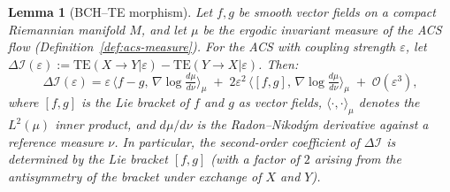 \documentclass[11pt,a4paper]{article}
\theoremstyle{plain}
\newtheorem{lemma}[theorem]{Lemma}
\theoremstyle{definition}
\theoremstyle{remark}
\newcommand{\DI}{\Delta\mathcal{I}}
\newcommand{\TE}{\mathrm{TE}}
\begin{document}
\begin{lemma}[BCH--TE morphism]\label{lem:bch-te}
Let $f, g$ be smooth vector fields on a compact Riemannian manifold $M$,
and let $\mu$ be the ergodic invariant measure of the ACS flow (Definition~\ref{def:acs-measure}).
For the ACS with coupling strength $\varepsilon$, let
$\DI(\varepsilon) := \TE(X{\to}Y|\varepsilon) - \TE(Y{\to}X|\varepsilon)$.
Then:
\[
  \DI(\varepsilon) = \varepsilon\,\langle f - g,\, \nabla\log\tfrac{d\mu}{d\nu}\rangle_\mu
  \;+\; 2\varepsilon^2\,\langle [f,g],\, \nabla\log\tfrac{d\mu}{d\nu}\rangle_\mu
  \;+\; \mathcal{O}(\varepsilon^3),
\]
where $[f,g]$ is the Lie bracket of $f$ and $g$ as vector fields,
$\langle\cdot,\cdot\rangle_\mu$ denotes the $L^2(\mu)$ inner product,
and $d\mu/d\nu$ is the Radon--Nikod\'ym derivative against a reference measure $\nu$.
In particular, the \emph{second-order coefficient of $\DI$ is determined by the Lie bracket $[f,g]$}
(with a factor of $2$ arising from the antisymmetry of the bracket under exchange of $X$ and $Y$).
\end{lemma}
\end{document}
